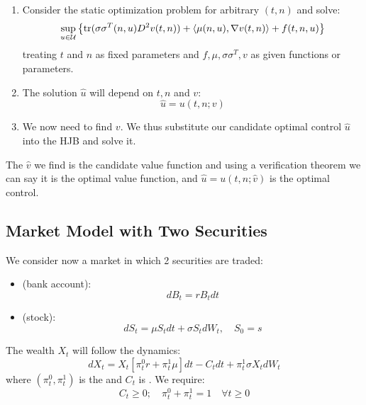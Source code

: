 \begin{enumerate}
    \item Consider the static optimization problem for arbitrary $(t,n)$ and solve:
    \begin{equation*}
        \sup_{u \in \mathcal{U}} \left\{ \operatorname{tr}(\sigma \sigma^T(n,u) D^2 v(t,n)) + \langle \mu(n,u), \nabla v(t,n) \rangle + f(t,n,u) \right\}
    \end{equation*}
    treating $t$ and $n$ as fixed parameters and $f, \mu, \sigma \sigma^T, v$ as given functions or parameters.
    
    \item The solution $\hat{u}$ will depend on $t, n$ and $v$:
    \begin{equation*}
        \hat{u} = u(t,n;v)
    \end{equation*}
    
    \item We now need to find $v$. We thus substitute our candidate optimal control $\hat{u}$ into the HJB and solve it.
\end{enumerate}

The $\hat{v}$ we find is the candidate value function and using a verification theorem we can say it is the optimal value function, and $\hat{u} = u(t,n;\hat{v})$ is the optimal control.

\subsection{Market Model with Two Securities}

We consider now a market in which 2 securities are traded:
\begin{itemize}
    \item {} (bank account):
    \begin{equation*}
        dB_t = r B_t dt
    \end{equation*}
    \item {} (stock):
    \begin{equation*}
        dS_t = \mu S_t dt + \sigma S_t dW_t, \quad S_0 = s
    \end{equation*}
\end{itemize}

The wealth $X_t$ will follow the dynamics:
\begin{equation}
    dX_t = X_t \left[ \pi_t^0 r + \pi_t^1 \mu \right] dt - C_t dt + \pi_t^1 \sigma X_t dW_t \tag{$*$}
\end{equation}
where $(\pi_t^0, \pi_t^1)$ is the  and $C_t$ is . We require:
\begin{equation*}
    C_t \geq 0; \quad \pi_t^0 + \pi_t^1 = 1 \quad \forall t \geq 0
\end{equation*}

